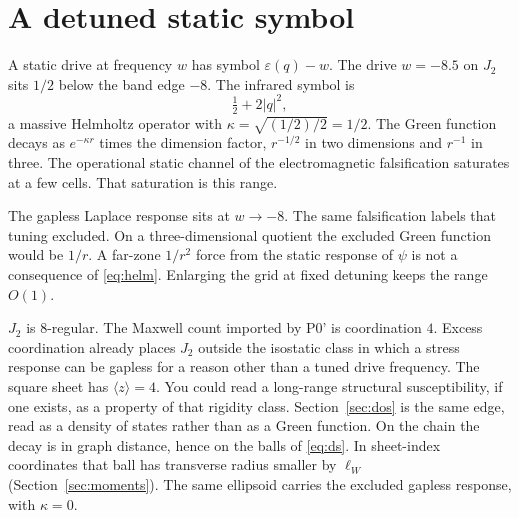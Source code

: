 \section{A detuned static symbol}
\label{sec:h-grav}

A static drive at frequency \(w\) has symbol \(\varepsilon(q)-w\).
The drive \(w=-8.5\) on \(J_2\) sits \(1/2\) below the band edge \(-8\).
The infrared symbol is
\begin{equation}
\label{eq:helm}
\tfrac12+2|q|^2,
\end{equation}
a massive Helmholtz operator with
\(\kappa=\sqrt{(1/2)/2}=1/2\).
The Green function decays as \(e^{-\kappa r}\) times the dimension factor,
\(r^{-1/2}\) in two dimensions and \(r^{-1}\) in three.
The operational static channel of the electromagnetic falsification
saturates at a few cells.
That saturation is this range.

The gapless Laplace response sits at \(w\to -8\).
The same falsification labels that tuning excluded.
On a three-dimensional quotient the excluded Green function would be
\(1/r\).
A far-zone \(1/r^2\) force from the static response of \(\psi\) is not a
consequence of \eqref{eq:helm}.
Enlarging the grid at fixed detuning keeps the range \(O(1)\).

\(J_2\) is \(8\)-regular.
The Maxwell count imported by P0' is coordination \(4\).
Excess coordination already places \(J_2\) outside the isostatic class in
which a stress response can be gapless for a reason other than a tuned
drive frequency.
The square sheet has \(\langle z\rangle=4\).
You could read a long-range structural susceptibility, if one exists, as
a property of that rigidity class.
Section~\ref{sec:dos} is the same edge, read as a density of states rather
than as a Green function.
On the chain the decay is in graph distance, hence on the balls of
\eqref{eq:ds}.
In sheet-index coordinates that ball has transverse radius smaller by
\(\ell_W\) (Section~\ref{sec:moments}).
The same ellipsoid carries the excluded gapless response, with
\(\kappa=0\).
